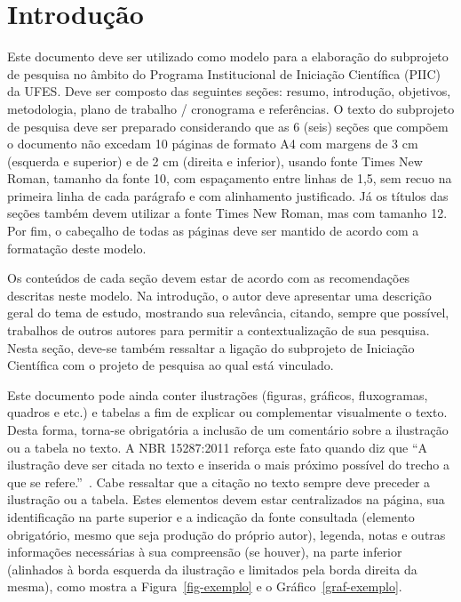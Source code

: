 \documentclass[10pt, a4paper]{article}
\begin{document}
  
\section{Introdução}

Este documento deve ser utilizado como modelo para a elaboração do subprojeto de pesquisa no âmbito do Programa Institucional de Iniciação Científica (PIIC) da UFES. Deve ser composto das seguintes seções: resumo, introdução, objetivos, metodologia, plano de trabalho / cronograma e referências. O texto do subprojeto de pesquisa deve ser preparado considerando que as 6 (seis) seções que compõem o documento não excedam 10 páginas de formato A4 com margens de 3 cm (esquerda e superior) e de 2 cm (direita e inferior), usando fonte Times New Roman, tamanho da fonte 10, com espaçamento entre linhas de 1,5, sem recuo na primeira linha de cada parágrafo e com alinhamento justificado. Já os títulos das seções também devem utilizar a fonte Times New Roman, mas com tamanho 12. Por fim, o cabeçalho de todas as páginas deve ser mantido de acordo com a formatação deste modelo.

Os conteúdos de cada seção devem estar de acordo com as recomendações descritas neste modelo. Na introdução, o autor deve apresentar uma descrição geral do tema de estudo, mostrando sua relevância, citando, sempre que possível, trabalhos de outros autores para permitir a contextualização de sua pesquisa. Nesta seção, deve-se também ressaltar a ligação do subprojeto de Iniciação Científica com o projeto de pesquisa ao qual está vinculado.

Este documento pode ainda conter ilustrações (figuras, gráficos, fluxogramas, quadros e etc.) e tabelas a fim de explicar ou complementar visualmente o texto. Desta forma, torna-se obrigatória a inclusão de um comentário sobre a ilustração ou a tabela no texto. A NBR 15287:2011 reforça este fato quando diz que ``A ilustração deve ser citada no texto e inserida o mais próximo possível do trecho a que se refere.''~\citep[p. 8]{abnt:nbr15287}. Cabe ressaltar que a citação no texto sempre deve preceder a ilustração ou a tabela. Estes elementos devem estar centralizados na página, sua identificação na parte superior e a indicação da fonte consultada (elemento obrigatório, mesmo que seja produção do próprio autor), legenda, notas e outras informações necessárias à sua compreensão (se houver), na parte inferior (alinhados à borda esquerda da ilustração e limitados pela borda direita da mesma), como mostra a Figura~\ref{fig-exemplo} e o Gráfico~\ref{graf-exemplo}.
\end{document}
